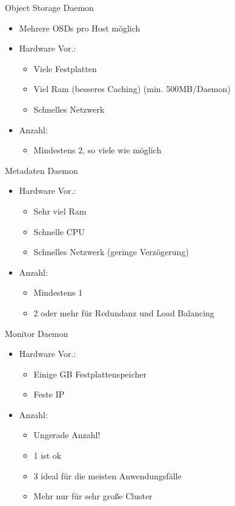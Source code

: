 \documentclass[hyperref={xetex}]{beamer}
\begin{document}
\begin{frame}{Object Storage Daemon}
	\begin{itemize}
		\item Mehrere OSDs pro Host m\"oglich
		\item Hardware Vor.:
		\begin{itemize}
			\item Viele Festplatten 
			\item Viel Ram (besseres Caching) (min. 500MB/Daemon)
			\item Schnelles Netzwerk
		\end{itemize}
		\item Anzahl:
		\begin{itemize}
			\item Mindestens 2, so viele wie m\"oglich
		\end{itemize}
	\end{itemize}
\end{frame}


\begin{frame}{Metadaten Daemon}
	\begin{itemize}

		\item Hardware Vor.:
		\begin{itemize}
			\item Sehr viel Ram
			\item Schnelle CPU
			\item Schnelles Netzwerk (geringe Verz\"ogerung)
		\end{itemize}
		\item Anzahl: 
		\begin{itemize}
			\item Mindestens 1
			\item 2 oder mehr f\"ur Redundanz und Load Balancing
		\end{itemize}
	\end{itemize}
\end{frame}


\begin{frame}{Monitor Daemon}
	\begin{itemize}
		\item Hardware Vor.:
		\begin{itemize}
			\item Einige GB Festplattenspeicher
			\item Feste IP
		\end{itemize}
		\item Anzahl:
		\begin{itemize}
			\item Ungerade Anzahl!
			\item 1 ist ok
			\item 3 ideal f\"ur die meisten Anwendungsf\"alle
			\item Mehr nur f\"ur sehr große Cluster
		\end{itemize}
	\end{itemize}
\end{frame}
\end{document}
